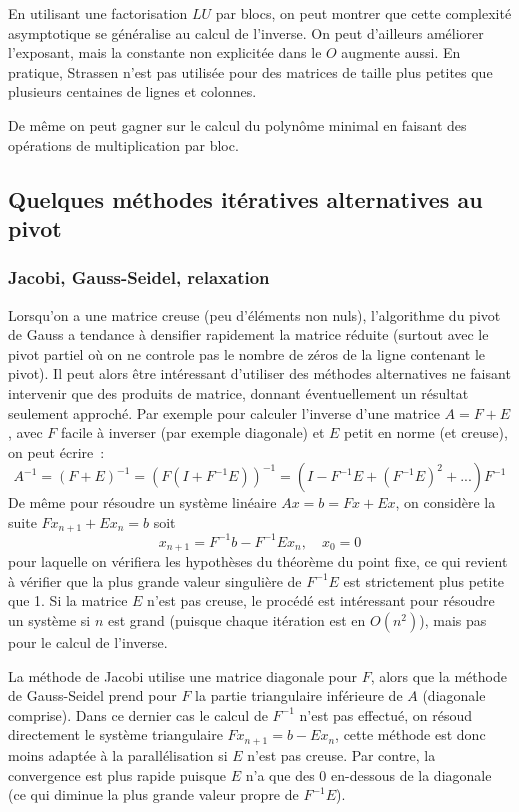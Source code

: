 \documentclass[a4paper,11pt]{article}
\begin{document}
En utilisant une factorisation $LU$ par blocs, on peut montrer
que cette complexit\'e asymptotique se g\'en\'eralise au
calcul de l'inverse. On peut d'ailleurs am\'eliorer l'exposant,
mais la constante non explicit\'ee dans le $O$ augmente aussi.
En pratique, Strassen n'est pas utilis\'ee pour des matrices
de taille plus petites que plusieurs centaines de lignes et colonnes.

De m\^eme on peut gagner sur le calcul du polyn\^ome minimal en
faisant des op\'erations de multiplication par bloc.

\subsection{Quelques m\'ethodes it\'eratives alternatives au pivot}
\subsubsection{Jacobi, Gauss-Seidel, relaxation} 
Lorsqu'on a une matrice creuse (peu d'\'el\'ements non nuls),
l'algorithme du pivot de Gauss a tendance \`a densifier rapidement
la matrice r\'eduite (surtout avec le pivot partiel o\`u on ne
controle pas le nombre de z\'eros de la ligne contenant le pivot). Il
peut alors \^etre int\'eressant d'utiliser des m\'ethodes alternatives
ne faisant intervenir que des produits de matrice, donnant \'eventuellement
un r\'esultat seulement approch\'e. Par exemple pour calculer
l'inverse d'une matrice $A=F+E$, avec $F$ facile \`a inverser (par
exemple diagonale) et 
$E$ petit en norme (et creuse), on peut \'ecrire~:
$$ A^{-1}=(F+E)^{-1} =
(F(I+F^{-1}E))^{-1}=(I-F^{-1}E+(F^{-1}E)^2+...)F^{-1}$$
De m\^eme pour r\'esoudre un syst\`eme lin\'eaire $Ax=b=Fx+Ex$,
on consid\`ere la suite $Fx_{n+1}+Ex_n=b$ soit
$$ x_{n+1}=F^{-1}b-F^{-1} E x_n, \quad x_0=0$$
pour laquelle on v\'erifiera les hypoth\`eses du th\'eor\`eme du point
fixe, ce qui revient \`a v\'erifier que la plus
grande valeur singuli\`ere de $F^{-1}E$ est strictement plus petite que 1.
Si la matrice $E$ n'est pas creuse, le proc\'ed\'e est int\'eressant
pour r\'esoudre un syst\`eme si $n$ est grand
(puisque chaque it\'eration est en $O(n^2)$), mais pas pour le calcul de
l'inverse.
 
La m\'ethode de Jacobi utilise une matrice diagonale pour $F$, alors
que la m\'ethode de Gauss-Seidel prend pour $F$ la partie triangulaire
inf\'erieure de $A$ (diagonale comprise). Dans ce dernier
cas le calcul de $F^{-1}$ n'est pas effectu\'e, on r\'esoud
directement le syst\`eme triangulaire $Fx_{n+1}=b-Ex_n$, cette
m\'ethode est donc moins adapt\'ee \`a la parall\'elisation si $E$
n'est pas creuse. 
Par contre, la convergence est plus rapide puisque $E$ n'a que
des 0 en-dessous de la diagonale (ce qui diminue la plus grande
valeur propre de $F^{-1}E$).
\end{document}
